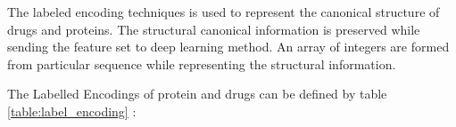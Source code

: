   The labeled encoding techniques is used to represent the canonical structure of drugs and proteins. The structural canonical information is preserved while sending the feature set to deep learning method. An array of integers are formed from particular sequence while representing the structural information.
  
  The Labelled Encodings of protein and drugs can be defined by table \ref{table:label_encoding} :
  \begin{table}[H]
    \centering
    \caption{Labeled Encoding of Proteins and Drugs}
    \label{table:label_encoding}
    \qquad

    \qquad
  \end{table}
  

  